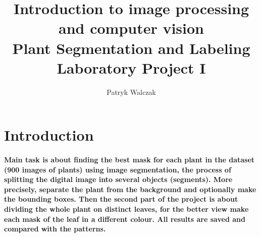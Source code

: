 \documentclass[12pt]{article}
\title{
\large Introduction to image processing and computer vision \\
\LARGE \textbf{Plant Segmentation and Labeling} \\
Laboratory Project I
}
\author{Patryk Walczak}
\begin{document}
\maketitle

\tableofcontents

\thispagestyle{empty}

\newpage

\clearpage
{}

\section{Introduction}

\paragraph{
Main task is about finding the best mask for each plant in the dataset (900 images of plants) using image segmentation, the process of splitting the digital image into several objects (segments). More precisely, separate the plant from the background and optionally make the bounding boxes. Then the second part of the project is about dividing the whole plant on distinct leaves, for the better view make each mask of the leaf in a different colour. All results are saved and compared with the patterns.
}
\end{document}
